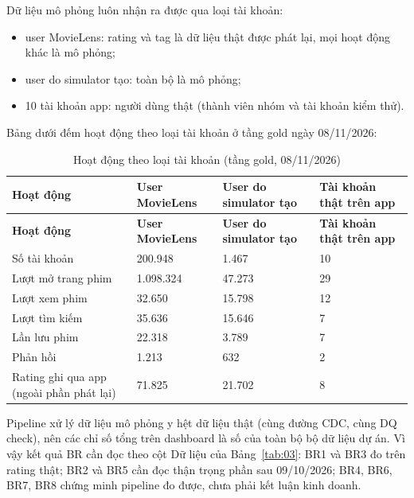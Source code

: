 \documentclass[a4paper,11pt]{article}
\newlength{\reporttablewidth}
\begin{document}
Dữ liệu mô phỏng luôn nhận ra được qua loại tài khoản:

\begin{itemize}
  \item user MovieLens: rating và tag là dữ liệu thật được phát lại, mọi hoạt động khác là mô phỏng;
  \item user do simulator tạo: toàn bộ là mô phỏng;
  \item 10 tài khoản app: người dùng thật (thành viên nhóm và tài khoản kiểm thử).
\end{itemize}

Bảng dưới đếm hoạt động theo loại tài khoản ở tầng gold ngày 08/11/2026:

\begingroup
\small
{}
\setlength{\tabcolsep}{4pt}
\renewcommand{\arraystretch}{1.18}
\setlength{\reporttablewidth}{\dimexpr\linewidth-6\tabcolsep\relax}
\begin{longtable}{@{}L{0.26\reporttablewidth} L{0.23\reporttablewidth} L{0.24\reporttablewidth} L{0.27\reporttablewidth}@{}}
\caption[Hoạt động theo loại tài khoản (mục 2.3)]{Hoạt động theo loại tài khoản (tầng gold, 08/11/2026)}\label{tab:05} \\
\toprule
\textbf{Hoạt động} & \textbf{User MovieLens} & \textbf{User do simulator tạo} & \textbf{Tài khoản thật trên app} \\
\midrule
\endfirsthead
\toprule
\textbf{Hoạt động} & \textbf{User MovieLens} & \textbf{User do simulator tạo} & \textbf{Tài khoản thật trên app} \\
\midrule
\endhead
\midrule
\endfoot
\bottomrule
\endlastfoot
Số tài khoản & 200.948 & 1.467 & 10 \\
Lượt mở trang phim & 1.098.324 & 47.273 & 29 \\
Lượt xem phim & 32.650 & 15.798 & 12 \\
Lượt tìm kiếm & 35.636 & 15.646 & 7 \\
Lần lưu phim & 22.318 & 3.789 & 7 \\
Phản hồi & 1.213 & 632 & 2 \\
Rating ghi qua app (ngoài phần phát lại) & 71.825 & 21.702 & 8 \\
\end{longtable}
\endgroup

Pipeline xử lý dữ liệu mô phỏng y hệt dữ liệu thật (cùng đường CDC, cùng DQ check), nên các chỉ số tổng trên dashboard là số của toàn bộ bộ dữ liệu dự án. Vì vậy kết quả BR cần đọc theo cột Dữ liệu của Bảng~\ref{tab:03}: BR1 và BR3 đo trên rating thật; BR2 và BR5 cần đọc thận trọng phần sau 09/10/2026; BR4, BR6, BR7, BR8 chứng minh pipeline đo được, chưa phải kết luận kinh doanh.
\end{document}
